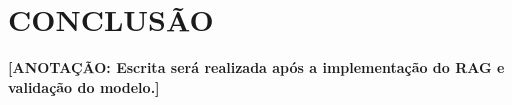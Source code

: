 \chapter{CONCLUSÃO}

\textbf{[ANOTAÇÃO: Escrita será realizada após a implementação do RAG e validação do modelo.]}